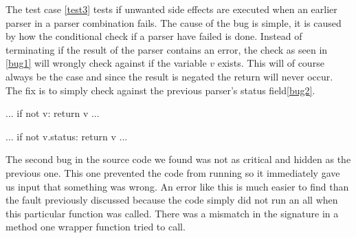 The test case \ref{test3} tests if unwanted side effects are executed when an earlier parser in a parser combination fails.
The cause of the bug is simple, it is caused by how the conditional check if a parser have failed is done.
Instead of terminating if the result of the parser contains an error, the check as seen in \ref{bug1} will wrongly check against if the variable $v$ exists.
This will of course always be the case and since the result is negated the return will never occur. The fix is to simply check against the previous parser's status field\ref{bug2}.


\renewcommand{\lstlistingname}{Code}

\begin{python}[caption={Fault in the source code.}, label=bug1]
    ...
    if not v:
        return v
    ...
\end{python}


\begin{python}[caption={The fix to the bug showcased in \ref{bug1}.}, label=bug2]
    ...
    if not v.status:
        return v
    ...
\end{python}


The second bug in the source code we found was not as critical and hidden as the previous one. This one prevented the code from running so it immediately gave us input that something was wrong.
An error like this is much easier to find than the fault previously discussed because the code simply did not run an all when this particular function was called.
There was a mismatch in the signature in a method one wrapper function tried to call.





